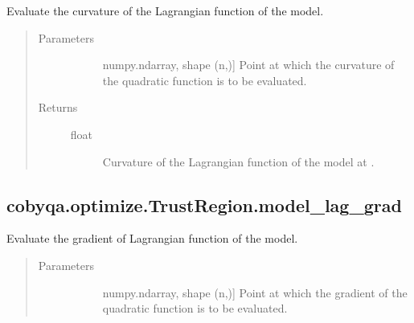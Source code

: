 \documentclass[letterpaper,10pt,english]{sphinxmanual}
\begin{document}
\begin{fulllineitems}
\begin{fulllineitems}
\label{\detokenize{refs/generated/cobyqa.optimize.TrustRegion.model_lag_curv:cobyqa.optimize.TrustRegion.model_lag_curv}}
\sphinxAtStartPar
Evaluate the curvature of the Lagrangian function of the model.
\begin{quote}\begin{description}
\item[{Parameters}] \leavevmode\begin{description}
\item[{}] \leavevmode{[}numpy.ndarray, shape (n,){]}
\sphinxAtStartPar
Point at which the curvature of the quadratic function is to be
evaluated.

\end{description}

\item[{Returns}] \leavevmode\begin{description}
\item[{float}] \leavevmode
\sphinxAtStartPar
Curvature of the Lagrangian function of the model at .

\end{description}

\end{description}\end{quote}

\end{fulllineitems}



\subsection{cobyqa.optimize.TrustRegion.model\_lag\_grad}
\label{\detokenize{refs/generated/cobyqa.optimize.TrustRegion.model_lag_grad:cobyqa-optimize-trustregion-model-lag-grad}}\label{\detokenize{refs/generated/cobyqa.optimize.TrustRegion.model_lag_grad::doc}}

\begin{fulllineitems}
\label{\detokenize{refs/generated/cobyqa.optimize.TrustRegion.model_lag_grad:cobyqa.optimize.TrustRegion.model_lag_grad}}
\sphinxAtStartPar
Evaluate the gradient of Lagrangian function of the model.
\begin{quote}\begin{description}
\item[{Parameters}] \leavevmode\begin{description}
\item[{}] \leavevmode{[}numpy.ndarray, shape (n,){]}
\sphinxAtStartPar
Point at which the gradient of the quadratic function is to be
evaluated.


\end{description}
\end{description}
\end{quote}
\end{fulllineitems}
\end{fulllineitems}
\end{document}
